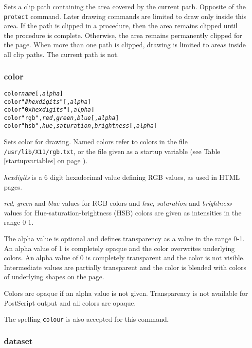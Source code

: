 Sets a clip path containing the area covered by the current path.
Opposite of the \texttt{protect} command.
Later drawing commands are limited to draw only inside this area.
If the path is clipped in a procedure, then the area remains
clipped until the procedure is complete.  Otherwise, the area
remains permanently clipped for the page.
When more than one path is clipped, drawing is limited to
areas inside all clip paths.
The current path is not.

\subsubsection{color}

\begin{alltt}
color \textit{name} [, \textit{alpha}]
color "\#\textit{hexdigits}" [, \textit{alpha}]
color "0x\textit{hexdigits}" [, \textit{alpha}]
color "rgb", \textit{red}, \textit{green}, \textit{blue} [, \textit{alpha}]
color "hsb", \textit{hue}, \textit{saturation}, \textit{brightness} [, \textit{alpha}]
\end{alltt}

Sets color for drawing.  Named colors refer to colors in the file
\texttt{/usr/lib/X11/rgb.txt}, or the file given as a startup variable (see
Table \ref{startupvariables} on page \pageref{startupvariables}).

\textit{hexdigits} is a 6 digit hexadecimal
value defining RGB values, as used in HTML pages.

\textit{red}, \textit{green} and \textit{blue} values for RGB colors and
\textit{hue}, \textit{saturation} and \textit{brightness} values for
Hue-saturation-brightness (HSB) colors are given as intensities in the range
0-1.

The alpha value is optional and defines transparency as a value in the range
0-1.  An alpha value of 1 is completely opaque and the color overwrites
underlying colors.  An alpha value of 0 is completely transparent and the color
is not visible.  Intermediate values are partially transparent and the color is
blended with colors of underlying shapes on the page.

Colors are opaque if an alpha value is not given.  Transparency is not
available for PostScript output and all colors are opaque.

The spelling \texttt{colour} is also accepted for this command.

\subsubsection{dataset}

